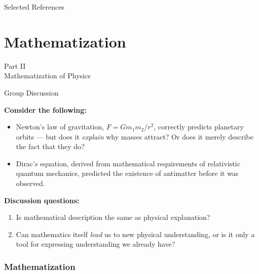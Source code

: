 \documentclass[fleqn]{beamer}
\begin{document}
\nocite{*}

\begin{frame}[allowframebreaks]{Selected References}
\printbibliography[heading=none, keyword=scientific-explanation]
\end{frame}


\part{Mathematization}

\begin{frame}[plain]
  \vfill
  \centering
  { Part II}\\[0.5em]
  {\large Mathematization of Physics}
  \vfill
\end{frame}

\begin{frame}{Group Discussion}

  \textbf{Consider the following:}

  \vspace{0.5em}
  \begin{itemize}
  \item Newton's law of gravitation, $F = Gm_1 m_2 / r^2$, correctly
    predicts planetary orbits --- but does it \emph{explain} why
    masses attract? Or does it merely describe the fact that they do?
  \item Dirac's equation, derived from mathematical requirements of
    relativistic quantum mechanics, predicted the existence of
    antimatter before it was observed.
  \end{itemize}

  \vspace{0.8em}
  \textbf{Discussion questions:}
  \begin{enumerate}
  \item Is mathematical description the same as physical explanation?
  \item Can mathematics itself \emph{lead} us to new physical
    understanding, or is it only a tool for expressing understanding
    we already have?
  \end{enumerate}

\end{frame}

\section{Mathematization}
\end{document}
